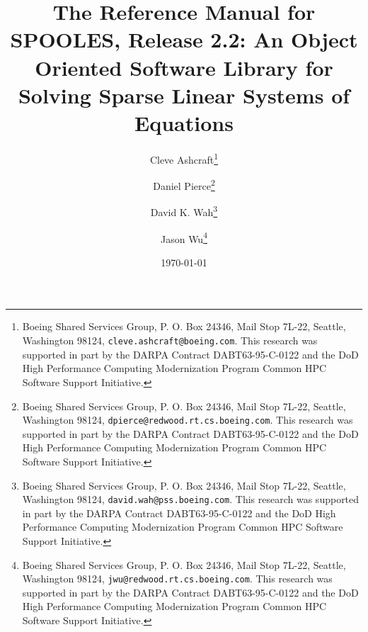 \documentclass[leqno,10pt,twoside]{report}
\begin{document}


\title{
       The Reference Manual for {\bf SPOOLES}, Release 2.2: \break
       An Object Oriented Software Library for Solving \break
       Sparse Linear Systems of Equations}
\author{
   Cleve Ashcraft\thanks{
   Boeing Shared Services Group,
   P. O. Box 24346,
   Mail Stop 7L-22,
   Seattle, Washington 98124,
   {\tt cleve.ashcraft@boeing.com}.
   This research was supported in part by the DARPA
   Contract DABT63-95-C-0122 and the DoD High Performance Computing
   Modernization Program Common HPC Software Support Initiative.}
 \and 
 Daniel Pierce\thanks{
   Boeing Shared Services Group,
   P. O. Box 24346,
   Mail Stop 7L-22,
   Seattle, Washington 98124,
   {\tt dpierce@redwood.rt.cs.boeing.com}.
   This research was supported in part by the DARPA
   Contract DABT63-95-C-0122 and the DoD High Performance Computing
   Modernization Program Common HPC Software Support Initiative.}
 \and 
 David K. Wah\thanks{
   Boeing Shared Services Group,
   P. O. Box 24346,
   Mail Stop 7L-22,
   Seattle, Washington 98124,
   {\tt david.wah@pss.boeing.com}.
   This research was supported in part by the DARPA
   Contract DABT63-95-C-0122 and the DoD High Performance Computing
   Modernization Program Common HPC Software Support Initiative.}
 \and 
 Jason Wu\thanks{
   Boeing Shared Services Group,
   P. O. Box 24346,
   Mail Stop 7L-22,
   Seattle, Washington 98124,
   {\tt jwu@redwood.rt.cs.boeing.com}.
   This research was supported in part by the DARPA
   Contract DABT63-95-C-0122 and the DoD High Performance Computing
   Modernization Program Common HPC Software Support Initiative.}
}
\date{\today}
\maketitle
\end{document}
